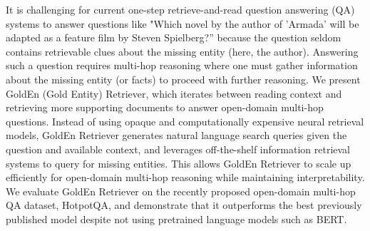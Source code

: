 It is challenging for current one-step retrieve-and-read question answering (QA) systems to answer questions like "Which
novel by the author of 'Armada' will be adapted as a feature film by Steven Spielberg?” because the question seldom contains retrievable clues about the missing entity (here, the author). Answering such a question requires multi-hop reasoning where one must gather information about the missing entity (or facts) to proceed with further reasoning. We present GoldEn (Gold Entity) Retriever, which iterates between reading context and retrieving more supporting documents to answer open-domain multi-hop questions. Instead of using opaque and computationally expensive neural retrieval models, GoldEn Retriever generates natural language search queries given the question and available context, and leverages off-the-shelf information retrieval systems to query for missing entities. This allows GoldEn Retriever to scale up efficiently for open-domain multi-hop reasoning while maintaining interpretability. We evaluate GoldEn Retriever on the recently proposed open-domain multi-hop QA dataset, HotpotQA, and demonstrate that it outperforms the best previously published model despite not using pretrained language models such as BERT.